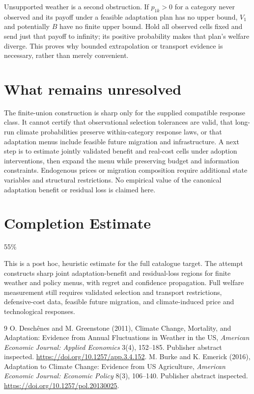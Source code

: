 \documentclass[11pt]{article}
\begin{document}
Unsupported weather is a second obstruction. If $p_{1k}>0$ for a category
never observed and its payoff under a feasible adaptation plan has no
upper bound, $V_1$ and potentially $B$ have no finite upper bound. Hold
all observed cells fixed and send just that payoff to infinity; its
positive probability makes that plan's welfare diverge. This proves why
bounded extrapolation or transport evidence is necessary, rather than
merely convenient.

\section{What remains unresolved}
The finite-union construction is sharp only for the supplied compatible
response class. It cannot certify that observational selection tolerances
are valid, that long-run climate probabilities preserve within-category
response laws, or that adaptation menus include feasible future migration
and infrastructure. A next step is to estimate jointly validated benefit
and real-cost cells under adoption interventions, then expand the menu
while preserving budget and information constraints. Endogenous prices or
migration composition require additional state variables and structural
restrictions. No empirical value of the canonical adaptation benefit or
residual loss is claimed here.

\section{Completion Estimate}
55\%

This is a post hoc, heuristic estimate for the full catalogue target.
The attempt constructs sharp joint adaptation-benefit and residual-loss regions for finite weather and policy menus, with regret and confidence propagation. Full welfare measurement still requires validated selection and transport restrictions, defensive-cost data, feasible future migration, and climate-induced price and technological responses.

\begin{thebibliography}{9}
 O. Desch\^enes and M. Greenstone (2011), Climate Change,
Mortality, and Adaptation: Evidence from Annual Fluctuations in Weather
in the US, \emph{American Economic Journal: Applied Economics} 3(4),
152--185. Publisher abstract inspected.
\url{https://doi.org/10.1257/app.3.4.152}.
 M. Burke and K. Emerick (2016), Adaptation to Climate Change:
Evidence from US Agriculture, \emph{American Economic Journal: Economic
Policy} 8(3), 106--140. Publisher abstract inspected.
\url{https://doi.org/10.1257/pol.20130025}.
\end{thebibliography}
\end{document}
